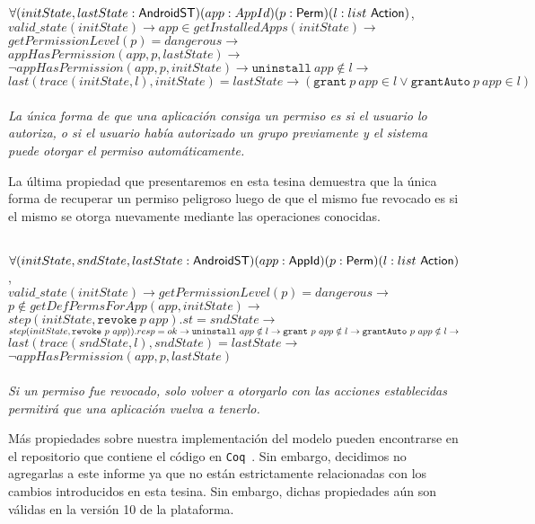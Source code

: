 \begin{prop}
    \label{impproperty2}
    \mbox{} \\
    $	\forall (initState,lastState:\mathsf{AndroidST}) (app:AppId) (p:\mathsf{Perm}) (l: list\ \mathsf{Action})$, \\
    $	valid\_state(initState) \rightarrow app \in getInstalledApps(initState) \rightarrow$ \\
    $	getPermissionLevel(p)= dangerous \rightarrow $\\
    $	appHasPermission(app,p,lastState) \rightarrow$\\
    $	\neg appHasPermission(app,p,initState)\rightarrow \texttt{uninstall}~app \notin l \rightarrow
    $ \\
    $	last(trace(initState,l),initState) = lastState \rightarrow (\texttt{grant}~p~app \in l \lor
        \texttt{grantAuto}~p~app \in l)$ \\ \\
    \textit{La única forma de que una aplicación consiga un permiso es si el usuario lo autoriza, o
        si el usuario había autorizado un grupo previamente y el sistema puede otorgar el permiso
        automáticamente.}
\end{prop}

La última propiedad que presentaremos en esta tesina demuestra que la única forma de recuperar un
permiso peligroso luego de que el mismo fue revocado es si el mismo se otorga nuevamente mediante
las operaciones conocidas.

\begin{prop}
    \mbox{} \\
    $	\forall (initState,sndState,lastState:\mathsf{AndroidST}) (app:\mathsf{AppId}) (p:\mathsf{Perm}) (l:
        list~\mathsf{Action})$, \\
    $	valid\_state(initState) \rightarrow getPermissionLevel(p) = dangerous \rightarrow$ \\
    $   p \notin getDefPermsForApp(app,initState) \rightarrow$ \\
    $	step(initState,\texttt{revoke}~p~app).st = sndState \rightarrow$ \\
    $	step(initState, \texttt{revoke}~p~app)).resp=ok \rightarrow \\
        \texttt{uninstall}~app \notin l \rightarrow \texttt{grant}~p~app \notin l \rightarrow
        \texttt{grantAuto}~p~app \notin l \rightarrow $\\
    $	last(trace(sndState,l),sndState) = lastState \rightarrow$\\
    $	\neg appHasPermission(app,p,lastState)$ \\ \\
    \textit{Si un permiso fue revocado, solo volver a otorgarlo con las acciones establecidas
        permitirá que una aplicación vuelva a tenerlo.}
\end{prop}

Más propiedades sobre nuestra implementación del modelo pueden encontrarse en el repositorio que
contiene el código en \texttt{Coq}~\cite{github-code}. Sin embargo, decidimos no agregarlas a este
informe ya que no están estrictamente relacionadas con los cambios introducidos en esta tesina. Sin
embargo, dichas propiedades aún son válidas en la versión 10 de la plataforma.